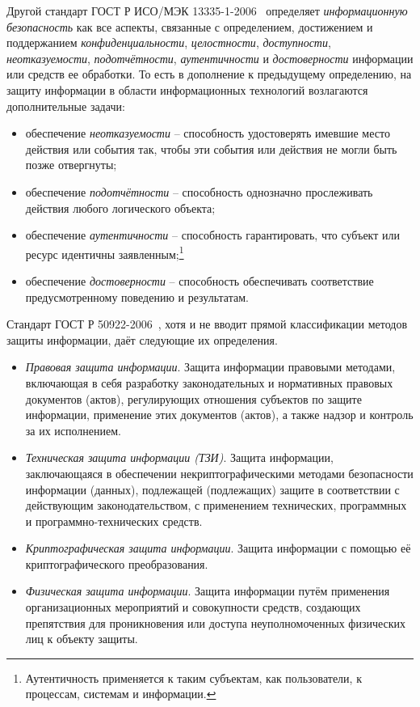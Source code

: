 Другой стандарт ГОСТ Р ИСО/МЭК 13335-1-2006~\cite{GOST-13335-1-2006} определяет \emph{информационную безопасность} как все аспекты, связанные с определением, достижением и поддержанием \emph{конфиденциальности}, \emph{целостности}, \emph{доступности}, \emph{неотказуемости}, \emph{подотчётности}, \emph{аутентичности} и \emph{достоверности} информации или средств ее обработки. То есть в дополнение к предыдущему определению, на защиту информации в области информационных технологий возлагаются дополнительные задачи:
\begin{itemize}
	\item обеспечение \emph{неотказуемости} -- способность удостоверять имевшие место действия или события так, чтобы эти события или действия не могли быть позже отвергнуты;
	\item обеспечение \emph{подотчётности} -- способность однозначно прослеживать действия любого логического объекта;
	\item обеспечение \emph{аутентичности} -- способность гарантировать, что субъект или ресурс идентичны заявленным;\footnote{Аутентичность применяется к таким субъектам, как пользователи, к процессам, системам и информации.}
	\item обеспечение \emph{достоверности} -- способность обеспечивать соответствие предусмотренному поведению и результатам.
\end{itemize}

Стандарт ГОСТ Р 50922-2006~\cite{GOST-50922-2006}, хотя и не вводит прямой классификации методов защиты информации, даёт следующие их определения.
\begin{itemize}
	\item \emph{Правовая защита информации}. Защита информации правовыми методами, включающая в себя разработку законодательных и нормативных правовых документов (актов), регулирующих отношения субъектов по защите информации, применение этих документов (актов), а также надзор и контроль за их исполнением.
	\item \emph{Техническая защита информации (ТЗИ)}. Защита информации, заключающаяся в обеспечении некриптографическими методами безопасности информации (данных), подлежащей (подлежащих) защите в соответствии с действующим законодательством, с применением технических, программных и программно-технических средств.
	\item \emph{Криптографическая защита информации}. Защита информации с помощью её криптографического преобразования.
	\item \emph{Физическая защита информации}. Защита информации путём применения организационных мероприятий и совокупности средств, создающих препятствия для проникновения или доступа неуполномоченных физических лиц к объекту защиты.
\end{itemize}

